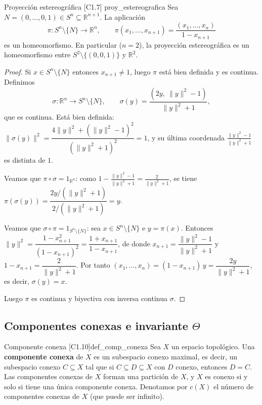 \begin{proposicion}{Proyección estereográfica [C1.7] \marcaE}{proy_estereografica}
Sea $N = (0,\dots,0,1) \in S^n \subseteq \mathbb{R}^{n+1}$. La aplicación
\[ \pi \colon S^n \setminus \{N\} \to \mathbb{R}^n, \qquad \pi(x_1,\dots,x_{n+1}) = \frac{(x_1,\dots,x_n)}{1 - x_{n+1}} \]
es un homeomorfismo. En particular ($n=2$), la proyección estereográfica es un homeomorfismo entre $S^2 \setminus \{(0,0,1)\}$ y $\mathbb{R}^2$.
\end{proposicion}

\begin{proof}
Si $x \in S^n \setminus \{N\}$ entonces $x_{n+1} \neq 1$, luego $\pi$ está bien definida y es continua. Definimos
\[ \sigma \colon \mathbb{R}^n \to S^n \setminus \{N\}, \qquad \sigma(y) = \frac{(2y,\ \|y\|^2 - 1)}{\|y\|^2 + 1}, \]
que es continua. Está bien definida: $\|\sigma(y)\|^2 = \dfrac{4\|y\|^2 + (\|y\|^2-1)^2}{(\|y\|^2+1)^2} = 1$, y su última coordenada $\frac{\|y\|^2-1}{\|y\|^2+1}$ es distinta de $1$.

Veamos que $\pi \circ \sigma = 1_{\mathbb{R}^n}$: como $1 - \frac{\|y\|^2-1}{\|y\|^2+1} = \frac{2}{\|y\|^2+1}$, se tiene $\pi(\sigma(y)) = \dfrac{2y/(\|y\|^2+1)}{2/(\|y\|^2+1)} = y$.

Veamos que $\sigma \circ \pi = 1_{S^n \setminus \{N\}}$: sea $x \in S^n \setminus \{N\}$ e $y = \pi(x)$. Entonces $\|y\|^2 = \dfrac{1 - x_{n+1}^2}{(1-x_{n+1})^2} = \dfrac{1+x_{n+1}}{1-x_{n+1}}$, de donde $x_{n+1} = \dfrac{\|y\|^2-1}{\|y\|^2+1}$ y $1-x_{n+1} = \dfrac{2}{\|y\|^2+1}$. Por tanto $(x_1,\dots,x_n) = (1-x_{n+1})\,y = \dfrac{2y}{\|y\|^2+1}$, es decir, $\sigma(y) = x$.

Luego $\pi$ es continua y biyectiva con inversa continua $\sigma$.
\end{proof}

\subsection{Componentes conexas e invariante $\Theta$}

\begin{definicion}{Componente conexa [C1.10]}{def_comp_conexa}
Sea $X$ un espacio topológico. Una \textbf{componente conexa} de $X$ es un subespacio conexo maximal, es decir, un subespacio conexo $C \subseteq X$ tal que si $C \subseteq D \subseteq X$ con $D$ conexo, entonces $D = C$. Las componentes conexas de $X$ forman una partición de $X$, y $X$ es conexo si y solo si tiene una única componente conexa. Denotamos por $c(X)$ el número de componentes conexas de $X$ (que puede ser infinito).
\end{definicion}

